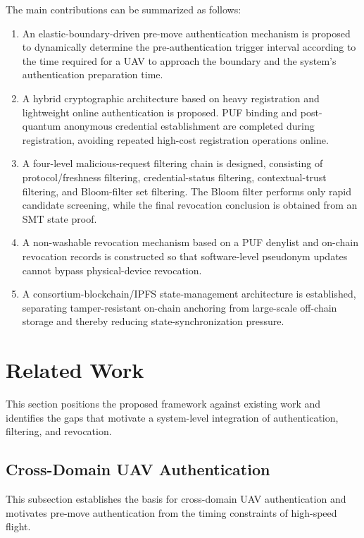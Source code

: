 \documentclass[lettersize,journal]{IEEEtran}
\begin{document}
	The main contributions can be summarized as follows:
	\begin{enumerate}
		\item An elastic-boundary-driven pre-move authentication mechanism is proposed to dynamically determine the pre-authentication trigger interval according to the time required for a UAV to approach the boundary and the system's authentication preparation time.
		\item A hybrid cryptographic architecture based on heavy registration and lightweight online authentication is proposed. PUF binding and post-quantum anonymous credential establishment are completed during registration, avoiding repeated high-cost registration operations online.
		\item A four-level malicious-request filtering chain is designed, consisting of protocol/freshness filtering, credential-status filtering, contextual-trust filtering, and Bloom-filter set filtering. The Bloom filter performs only rapid candidate screening, while the final revocation conclusion is obtained from an SMT state proof.
		\item A non-washable revocation mechanism based on a PUF denylist and on-chain revocation records is constructed so that software-level pseudonym updates cannot bypass physical-device revocation.
		\item A consortium-blockchain/IPFS state-management architecture is established, separating tamper-resistant on-chain anchoring from large-scale off-chain storage and thereby reducing state-synchronization pressure.
	\end{enumerate}
	
	\section{Related Work}
	This section positions the proposed framework against existing work and identifies the gaps that motivate a system-level integration of authentication, filtering, and revocation.
	
	
	\subsection{Cross-Domain UAV Authentication}
	This subsection establishes the basis for cross-domain UAV authentication and motivates pre-move authentication from the timing constraints of high-speed flight.
	
\end{document}
